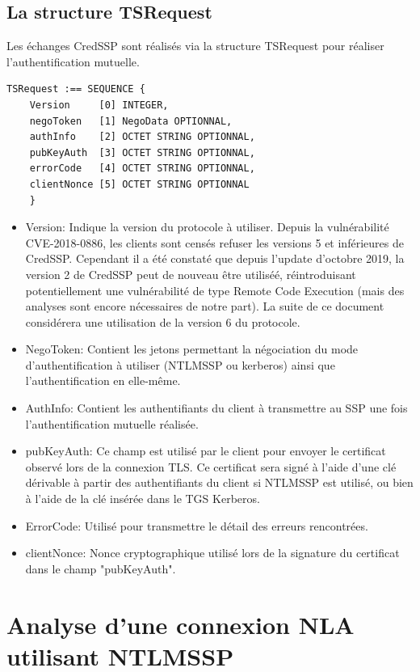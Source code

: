 \subsection{La structure TSRequest}
Les \'echanges CredSSP sont réalisés via la structure TSRequest pour réaliser l'authentification mutuelle.

\begin{lstlisting}[frame=single,basicstyle=\tiny]
TSRequest :== SEQUENCE {
	Version     [0] INTEGER,
	negoToken   [1] NegoData OPTIONNAL,
	authInfo    [2] OCTET STRING OPTIONNAL,
	pubKeyAuth  [3] OCTET STRING OPTIONNAL,
	errorCode   [4] OCTET STRING OPTIONNAL,
	clientNonce [5] OCTET STRING OPTIONNAL
	}
\end{lstlisting}


\begin{itemize}
	\item Version: Indique la version du protocole à utiliser. Depuis la vuln\'erabilité CVE-2018-0886, les clients sont censés refuser les versions 5 et inférieures de CredSSP. Cependant il a été constaté que depuis l’update d’octobre 2019, la version 2 de CredSSP peut de nouveau être utiliséé, réintroduisant potentiellement une vulnérabilité de type Remote Code Execution (mais des analyses sont encore nécessaires de notre part). La suite de ce document considérera une utilisation de la version 6 du protocole.
	\item NegoToken: Contient les jetons permettant la n\'egociation du mode d'authentification à utiliser (NTLMSSP ou kerberos) ainsi que l'authentification en elle-même.
	\item AuthInfo: Contient les authentifiants du client à transmettre au SSP une fois l'authentification mutuelle r\'ealisée. 
	\item pubKeyAuth: Ce champ est utilis\'e par le client pour envoyer le certificat observé lors de la connexion TLS. Ce certificat sera signé à l'aide d'une clé dérivable à partir des authentifiants du client si NTLMSSP est utilisé, ou bien à l'aide de la clé insérée dans le TGS Kerberos. 
	\item ErrorCode: Utilis\'e pour transmettre le détail des erreurs rencontrées.
	\item clientNonce: Nonce cryptographique utilis\'e lors de la signature du certificat dans le champ "pubKeyAuth".
\end{itemize}

\section{Analyse d'une connexion NLA utilisant NTLMSSP}

